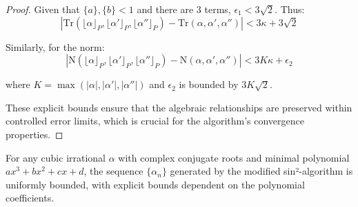 \begin{proof}
Given that $\{a\}, \{b\} < 1$ and there are 3 terms, $\epsilon_1 < 3\sqrt{2}$. Thus:
\begin{equation}
|\text{Tr}(\lfloor\alpha\rfloor_P, \lfloor\alpha'\rfloor_P, \lfloor\alpha''\rfloor_P) - \text{Tr}(\alpha, \alpha', \alpha'')| < 3\kappa + 3\sqrt{2}
\end{equation}

Similarly, for the norm:
\begin{equation}
|\text{N}(\lfloor\alpha\rfloor_P, \lfloor\alpha'\rfloor_P, \lfloor\alpha''\rfloor_P) - \text{N}(\alpha, \alpha', \alpha'')| < 3K\kappa + \epsilon_2
\end{equation}

where $K = \max(|\alpha|, |\alpha'|, |\alpha''|)$ and $\epsilon_2$ is bounded by $3K\sqrt{2}$.

These explicit bounds ensure that the algebraic relationships are preserved within controlled error limits, which is crucial for the algorithm's convergence properties.
\end{proof}

\begin{lemma}\label{lem:boundedness}
For any cubic irrational $\alpha$ with complex conjugate roots and minimal polynomial $ax^3 + bx^2 + cx + d$, the sequence $\{\alpha_n\}$ generated by the modified sin²-algorithm is uniformly bounded, with explicit bounds dependent on the polynomial coefficients.
\end{lemma}

